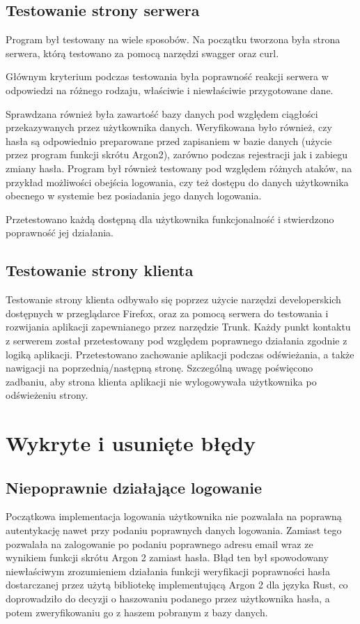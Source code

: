 \documentclass[a4paper,twoside,12pt]{book}
\begin{document}
\subsection{Testowanie strony serwera}
Program był testowany na wiele sposobów. Na początku tworzona była strona serwera,
którą testowano za pomocą narzędzi swagger oraz curl. 

Głównym kryterium podczas testowania była poprawność reakcji serwera w odpowiedzi
na różnego rodzaju, właściwie i niewłaściwie przygotowane dane. 

Sprawdzana również była zawartość bazy danych pod względem ciągłości przekazywanych
przez użytkownika danych. Weryfikowana było również, czy hasła są odpowiednio preparowane
przed zapisaniem w bazie danych (użycie przez program funkcji skrótu Argon2), zarówno
podczas rejestracji jak i zabiegu zmiany hasła. Program był również testowany pod względem
różnych ataków, na przykład możliwości obejścia logowania, czy też dostępu do danych użytkownika
obecnego w systemie bez posiadania jego danych logowania.

Przetestowano każdą dostępną dla użytkownika funkcjonalność 
i stwierdzono poprawność jej działania.

\subsection{Testowanie strony klienta}

Testowanie strony klienta odbywało się poprzez użycie narzędzi developerskich dostępnych
w przeglądarce Firefox, oraz za pomocą serwera do testowania i rozwijania aplikacji
zapewnianego przez narzędzie Trunk. Każdy punkt kontaktu z serwerem został przetestowany
pod względem poprawnego działania zgodnie z logiką aplikacji. Przetestowano zachowanie
aplikacji podczas odświeżania, a także nawigacji na poprzednią/następną stronę.
Szczególną uwagę poświęcono zadbaniu, aby strona klienta aplikacji nie wylogowywała 
użytkownika po odświeżeniu strony.

\section{Wykryte i usunięte błędy}
\subsection{Niepoprawnie działające logowanie}
Początkowa implementacja logowania użytkownika nie pozwalała na poprawną
autentykację nawet przy podaniu poprawnych danych logowania. Zamiast tego
pozwalała na zalogowanie po podaniu poprawnego adresu email wraz ze wynikiem
funkcji skrótu Argon 2 zamiast hasła. Błąd ten był spowodowany niewłaściwym 
zrozumieniem działania funkcji weryfikacji poprawności hasła dostarczanej
przez użytą bibliotekę implementującą Argon 2 dla języka Rust, co doprowadziło
do decyzji o haszowaniu podanego przez użytkownika hasła, a potem 
zweryfikowaniu go z haszem pobranym z bazy danych.
\end{document}
